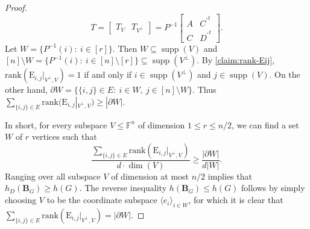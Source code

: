 \documentclass{toc}
\theoremstyle{plain}
\numberwithin{equation}{section}
\theoremstyle{definition}
\newcommand{\F}{\mathbb{F}}
\newcommand{\rk}{\mathrm{rank}}
\DeclareMathOperator{\supp}{supp}
\newcommand{\ab}[1]{\left\lvert#1\right\rvert}
\newcommand{\tuple}[1]{\mathbf{#1}}
\newcommand{\vB}{\tuple{B}}
\newcommand{\E}{\mathrm{E}}
\newcommand{\ann}{V^{\perp}}
\begin{document}
\begin{proof}
    $$
    T=
    \begin{bmatrix}
        T_V & T_{\ann}
    \end{bmatrix}
    =P^{-1}
    \begin{bmatrix}
        A&{C^{\prime}}^t\\C&{D^{\prime}}^t
    \end{bmatrix}.
    $$
    Let $W=\{P^{-1}(i):~i\in[r]\}$. Then $W\subseteq \supp(V)$ and $[n]\setminus W=\{P^{-1}(i):~i\in[n]\setminus[r]\}\subseteq \supp(\ann)$. By \cref{claim:rank-Eij}, $\rk(\E_{i,j}|_{\ann, V})=1$ if and only if $i\in\supp(\ann)$ and $j\in\supp(V)$. On the other hand, $\partial W=\{\{i,j\}\in E:~i\in W,~j\in[n]\setminus W\}$. Thus $\sum_{\{i,j\}\in E}\rk(\E_{i,j}|_{\ann, V})\geq |\partial W|$. 

    In short, for every subspace $V\leq \F^n$ of dimension $1 \leq r\leq n/2$, we can find a set $W$ of $r$ vertices such that 
    \begin{equation}\label{eq: dim edge exp greater than edge exp}
      \frac{\sum_{\{i,j\}\in E}\rk(\E_{i,j}|_{\ann, V})}{d\cdot \dim(V)}\geq \frac{|\partial W|}{d|W|}.
    \end{equation}
    Ranging over all subspace $V$ of dimension at most $n/2$ implies that $h_D(\vB_G)\geq h(G)$. The reverse inequality $h(\vB_G)\leq h(G)$ follows by simply choosing $V$ to be the coordinate subspace $\langle e_i\rangle_{i \in W}$, for which it is clear that $\sum_{\{i,j\} \in E} \rk(\E_{i,j}|_{\ann,V})=\ab{\partial W}$.
\end{proof}
\end{document}
